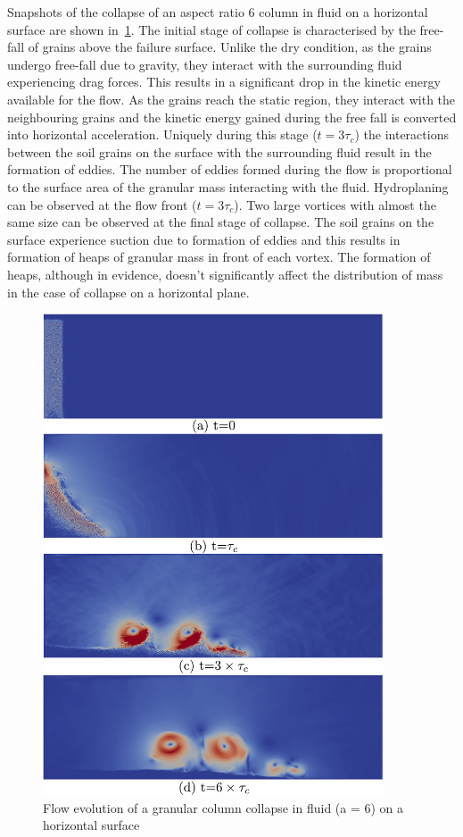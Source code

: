 Snapshots of the collapse of an aspect ratio 6 column in fluid on a horizontal 
surface are shown in~\cref{fig:LBM_DEM_a6}. The initial stage of collapse is 
characterised by the free-fall of grains above the failure surface. Unlike the 
dry condition, as the grains undergo free-fall due to gravity, they interact 
with the surrounding fluid experiencing drag forces. This results in a 
significant drop in the kinetic energy available for the flow. As the grains 
reach the static region, they interact with the neighbouring grains and the 
kinetic energy gained during the free fall is converted into horizontal 
acceleration. Uniquely during this stage ($t = 3\tau_c$) the interactions 
between the soil grains on the surface with the surrounding fluid result in the 
formation of eddies. The number of eddies formed during the flow is 
proportional to the surface area of the granular mass interacting with the 
fluid. Hydroplaning can be observed at the flow front ($t = 3\tau_c$). Two 
large vortices with almost the same size can be observed at the final stage of 
collapse. The soil grains on the surface experience suction due to formation of 
eddies and this results in formation of heaps of granular mass in front of each 
vortex. The formation of heaps, although in evidence, doesn't significantly 
affect the distribution of mass in the case of collapse on a horizontal plane. 

\begin{figure}[htpb]
\centering
\includegraphics[width=0.9\textwidth]{LBM_DEM_a6}
\caption{Flow evolution of a granular column collapse in fluid (a = 6) on a 
horizontal surface}
\label{fig:LBM_DEM_a6}
\end{figure}


